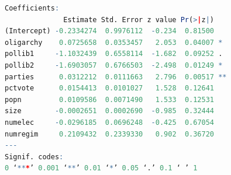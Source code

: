 \documentclass{article}
\begin{document}
	\begin{figure}[H]
		\begin{lstlisting}[language=R]
Coefficients:
              Estimate Std. Error z value Pr(>|z|)   
(Intercept) -0.2334274  0.9976112  -0.234  0.81500   
oligarchy    0.0725658  0.0353457   2.053  0.04007 * 
pollib1     -1.1032439  0.6558114  -1.682  0.09252 . 
pollib2     -1.6903057  0.6766503  -2.498  0.01249 * 
parties      0.0312212  0.0111663   2.796  0.00517 **
pctvote      0.0154413  0.0101027   1.528  0.12641   
popn         0.0109586  0.0071490   1.533  0.12531   
size        -0.0002651  0.0002690  -0.985  0.32444   
numelec     -0.0296185  0.0696248  -0.425  0.67054   
numregim     0.2109432  0.2339330   0.902  0.36720   
---
Signif. codes:  
0 ‘***’ 0.001 ‘**’ 0.01 ‘*’ 0.05 ‘.’ 0.1 ‘ ’ 1
    	\end{lstlisting}
    	\end{figure}
    	
\end{document}
